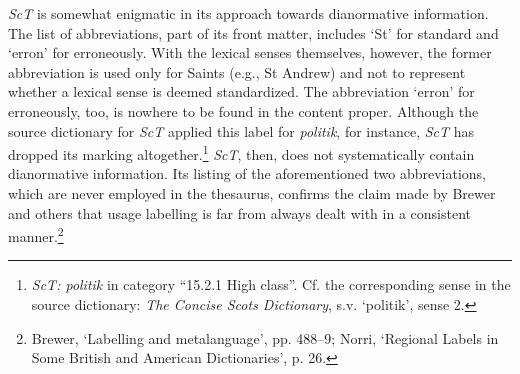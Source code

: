 \textit{ScT} is somewhat enigmatic in its approach towards dianormative information. The list of abbreviations, part of its front matter, includes `St' for standard and `erron' for erroneously. With the lexical senses themselves, however, the former abbreviation is used only for Saints (e.g., St Andrew) and not to represent whether a lexical sense is deemed standardized. The abbreviation `erron' for erroneously, too, is nowhere to be found in the content proper. Although the source dictionary for \textit{ScT} applied this label for \textit{politik}, for instance, \textit{ScT} has dropped its marking altogether.\footnote{\textit{ScT: politik} in category ``15.2.1 High class''. Cf. the corresponding sense in the source dictionary: \textit{The Concise Scots Dictionary}, %
s.v. `politik', sense 2.} \textit{ScT}, then, does not systematically contain dianormative information. Its listing of the aforementioned two abbreviations, which are never employed in the thesaurus, confirms the claim made by Brewer and others that usage labelling is far from always dealt with in a consistent manner.\footnote{Brewer, `Labelling and metalanguage', pp. 488–9; Norri, `Regional Labels in Some British and American Dictionaries', p. 26.}

